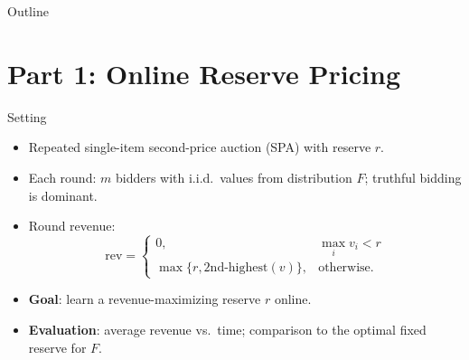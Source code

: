 \documentclass{beamer}
\begin{document}
\maketitle

\begin{frame}{Outline}
    \tableofcontents
\end{frame}


\section{Part 1: Online Reserve Pricing}

\begin{frame}{Setting}
  \begin{itemize}
    \item Repeated single-item second-price auction (SPA) with reserve $r$.
    \item Each round: $m$ bidders with i.i.d.\ values from distribution $F$; truthful bidding is dominant.
    \item Round revenue:
      \[
        \text{rev}=\begin{cases}
          0, & \max_i v_i<r\\[4pt]
          \max\{r,\text{2nd-highest}(v)\}, & \text{otherwise.}
        \end{cases}
      \]
    \item \textbf{Goal}: learn a revenue-maximizing reserve $r$ online.
    \item \textbf{Evaluation}: average revenue vs.\ time; comparison to the optimal fixed reserve for $F$.
  \end{itemize}
\end{frame}
\end{document}
